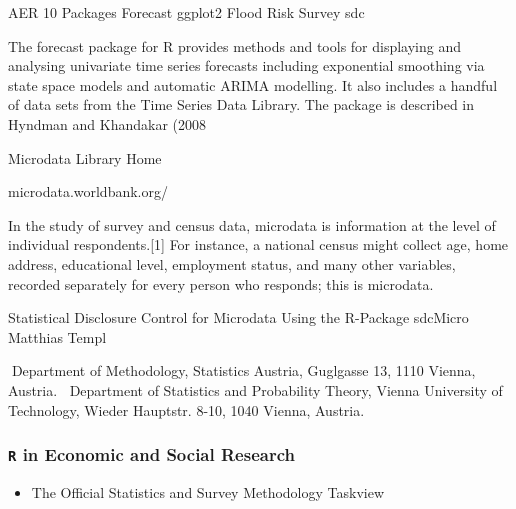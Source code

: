 \documentclass{beamer}
\begin{document}

AER
10 Packages
Forecast
ggplot2
Flood Risk
Survey
sdc


The forecast package for R provides methods and tools for displaying and analysing univariate time series forecasts including exponential smoothing via state space models and automatic ARIMA modelling. It also includes a handful of data sets from the Time Series Data Library. The package is described in Hyndman and Khandakar (2008


Microdata Library Home



microdata.worldbank.org/


In the study of survey and census data, microdata is information at the level of individual respondents.[1] For instance, a national census might collect age, home address, educational level, employment status, and many other variables, recorded separately for every person who responds; this is microdata.



Statistical Disclosure Control for Microdata
Using the R-Package sdcMicro
Matthias Templ

Department of Methodology, Statistics Austria, Guglgasse 13, 1110 Vienna, Austria. Department of Statistics
and Probability Theory, Vienna University of Technology, Wieder Hauptstr. 8-10, 1040 Vienna, Austria.

\begin{frame}[fragile]
\frametitle{\texttt{R} in Economic and Social Research}

\begin{itemize}
\item The Official Statistics and Survey Methodology Taskview
\end{itemize}

\end{frame}
\end{document}
